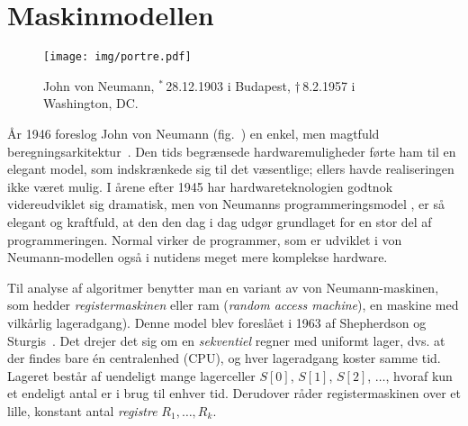 \section{Maskinmodellen}

\begin{wrapfigure}{r}{4cm}
\begin{center}
\texttt{[image: img/portre.pdf]}
\end{center}
\caption{John von Neumann, ${}^*\,$28{.}12{.}1903 i Budapest,
$\dag\,$8{.}2{.}1957 i Washington, DC.}
\end{wrapfigure}

%
%     
År 1946 foreslog John von Neumann  
(fig.~)
%
en enkel, men magtfuld beregningsarkitektur~\cite{Neu45}.
Den tids begrænsede hardwaremuligheder førte ham til en elegant model, som indskrænkede sig til det væsentlige; ellers havde realiseringen ikke været mulig.
I årene efter 1945 har hardwareteknologien godtnok videreudviklet sig dramatisk, men von Neumanns programmeringsmodel
,
er så elegant og kraftfuld, at den den dag i dag udgør grundlaget for en stor del af programmeringen.
Normal virker de programmer, som er udviklet i von Neumann-modellen også i nutidens meget mere komplekse hardware.

Til analyse af algoritmer benytter man en variant av von Neumann-maskinen, som hedder \emph{registermaskinen} eller ram (\emph{random access machine}),
%
%
%
en maskine med vilkårlig lageradgang).
Denne model blev foreslået i 1963 af Shepherdson
 og Sturgis~\cite{Shepherdson-Sturgis}. 
Det drejer det sig om en \emph{sekventiel} regner
med uniformt lager, dvs. at der findes bare én centralenhed (CPU),
og hver lageradgang koster samme tid.
Lageret består af uendeligt mange lagerceller $S[0]$, $S[1]$, $S[2]$, $\ldots$, hvoraf kun et endeligt antal er i brug til enhver tid.
Derudover råder registermaskinen over et lille, konstant antal \emph{registre} $R_1,\ldots, R_k$.

